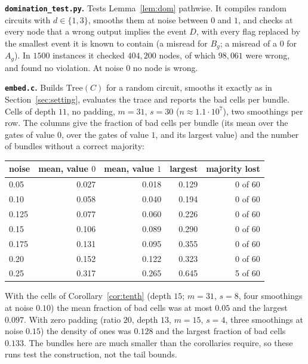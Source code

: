 \documentclass[11pt]{amsart}
\theoremstyle{definition}
\theoremstyle{remark}
\begin{document}
\medskip\noindent\textbf{\texttt{domination\_test.py}.} Tests Lemma~\ref{lem:dom} pathwise. It
compiles random circuits with $d\in\{1,3\}$, smooths them at noise between $0$ and $1$, and checks
at every node that a wrong output implies the event $D$, with every flag replaced by the smallest
event it is known to contain (a misread for $B_g$; a misread of a $0$ for $A_g$). In $1500$
instances it checked $404{,}200$ nodes, of which $98{,}061$ were wrong, and found no violation. At
noise $0$ no node is wrong.

\medskip\noindent\textbf{\texttt{embed.c}.} Builds $\mathrm{Tree}(C)$ for a random circuit, smooths
it exactly as in Section~\ref{sec:setting}, evaluates the trace and reports the bad cells per
bundle. Cells of depth $11$, no padding, $m=31$, $s=30$ ($n\approx1.1\cdot10^7$), two smoothings
per row. The columns give the fraction of bad cells per bundle (its mean over the gates of value
$0$, over the gates of value $1$, and its largest value) and the number of bundles without a
correct majority:

\begin{center}
\begin{tabular}{lrrrr}
\toprule
noise & mean, value $0$ & mean, value $1$ & largest & majority lost\\
\midrule
0.05 & 0.027 & 0.018 & 0.129 & 0 of 60\\
0.10 & 0.058 & 0.040 & 0.194 & 0 of 60\\
0.125 & 0.077 & 0.060 & 0.226 & 0 of 60\\
0.15 & 0.106 & 0.089 & 0.290 & 0 of 60\\
0.175 & 0.131 & 0.095 & 0.355 & 0 of 60\\
0.20 & 0.152 & 0.122 & 0.323 & 0 of 60\\
0.25 & 0.317 & 0.265 & 0.645 & 5 of 60\\
\bottomrule
\end{tabular}
\end{center}

\noindent With the cells of Corollary~\ref{cor:tenth} (depth $15$; $m=31$, $s=8$, four smoothings
at noise $0.10$) the mean fraction of bad cells was at most $0.05$ and the largest $0.097$. With
zero padding (ratio $20$, depth $13$, $m=15$, $s=4$, three smoothings at noise $0.15$) the density
of ones was $0.128$ and the largest fraction of bad cells $0.133$. The bundles here are much
smaller than the corollaries require, so these runs test the construction, not the tail bounds.
\end{document}
